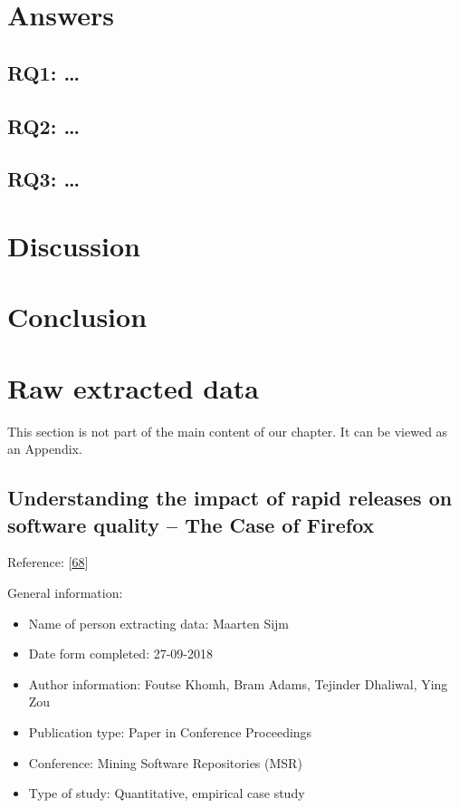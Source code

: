 \documentclass[]{book}
\providecommand{\tightlist}{%
  \setlength{\itemsep}{0pt}\setlength{\parskip}{0pt}}
\begin{document}
\section{Answers}\label{answers-3}

\subsection{RQ1: \ldots{}}\label{rq1}

\subsection{RQ2: \ldots{}}\label{rq2}

\subsection{RQ3: \ldots{}}\label{rq3}

\section{Discussion}\label{discussion}

\section{Conclusion}\label{conclusion}

\section{Raw extracted data}\label{raw-extracted-data}

This section is not part of the main content of our chapter. It can be
viewed as an Appendix.

\subsection{Understanding the impact of rapid releases on software
quality -- The Case of
Firefox}\label{understanding-the-impact-of-rapid-releases-on-software-quality-the-case-of-firefox}

Reference: {[}\protect\hyperlink{ref-khomh2015a}{68}{]}

General information:

\begin{itemize}
\tightlist
\item
  Name of person extracting data: Maarten Sijm
\item
  Date form completed: 27-09-2018
\item
  Author information: Foutse Khomh, Bram Adams, Tejinder Dhaliwal, Ying
  Zou
\item
  Publication type: Paper in Conference Proceedings
\item
  Conference: Mining Software Repositories (MSR)
\item
  Type of study: Quantitative, empirical case study
\end{itemize}
\end{document}
